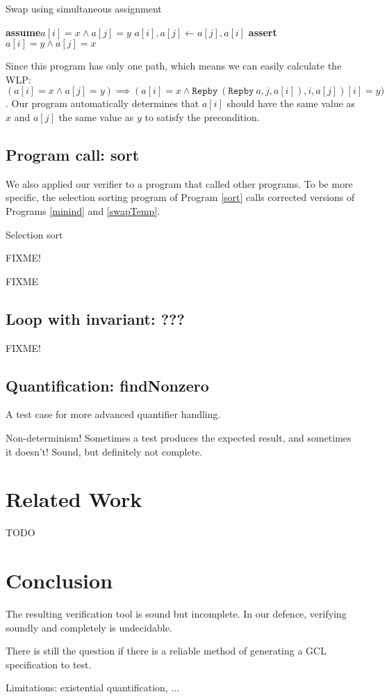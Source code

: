 \documentclass[a4paper]{article}
\newcommand{\Assert}{\State\textbf{assert}\xspace}
\newcommand{\Assume}{\State\textbf{assume}\xspace}
\begin{document}
\begin{algorithm}\label{swapSimultaneous}
\caption{Swap using simultaneous assignment}
\begin{algorithmic}
\Assume $a[i] = x \wedge a[j] = y$
\State $a[i], a[j] \gets a[j], a[i]$
\Assert $a[i] = y \wedge a[j] = x$
\end{algorithmic}
\end{algorithm}

Since this program has only one path, which means we can easily calculate the WLP: $(a[i] = x \wedge a[j] = y) \implies (a[i] = x \wedge \texttt{Repby}\ (\texttt{Repby}\ a, j, a[i]), i, a[j])[i] = y)$. Our program automatically determines that $a[i]$ should have the same value as $x$ and $a[j]$ the same value as $y$ to satisfy the precondition.

\subsection{Program call: sort}

We also applied our verifier to a program that called other programs. To be more specific, the selection sorting program of Program \ref{sort} calls corrected versions of Programs \ref{minind} and \ref{swapTemp}.

\begin{algorithm}\label{sort}
\caption{Selection sort}
\begin{algorithmic}
FIXME!
\end{algorithmic}
\end{algorithm}
FIXME

\subsection{Loop with invariant: ???}

FIXME!

\subsection{Quantification: findNonzero}

A test case for more advanced quantifier handling.

Non-determinism! Sometimes a test produces the expected result, and sometimes it doesn't!
Sound, but definitely not complete.

\section{Related Work}

TODO

\section{Conclusion}

The resulting verification tool is sound but incomplete. In our defence,
verifying soundly and completely is undecidable.

There is still the question if there is a reliable method of generating a GCL
specification to test.

Limitations: existential quantification, ...



\end{document}
